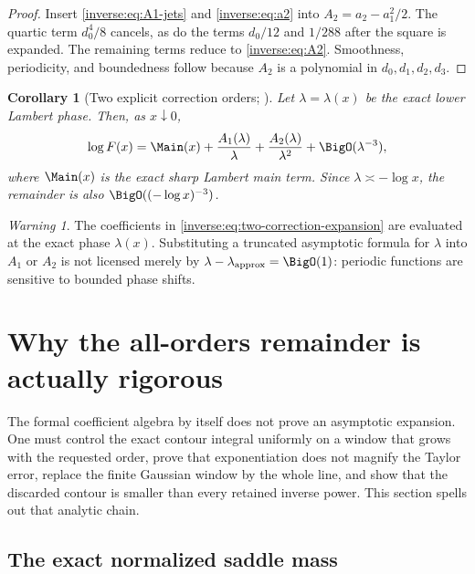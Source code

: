 \documentclass[11pt,oneside]{article}
\newtheorem{corollary}[corollary]{Corollary}
\theoremstyle{definition}
\theoremstyle{remark}
\newtheorem{warning}[warning]{Warning}
\begin{document}
\begin{proof}
Insert \eqref{inverse:eq:A1-jets} and \eqref{inverse:eq:a2} into
$A_2=a_2-a_1^2/2$.  The quartic term $d_0^4/8$ cancels, as do the
terms $d_0/12$ and $1/288$ after the square is expanded.  The remaining
terms reduce to \eqref{inverse:eq:A2}.  Smoothness, periodicity, and boundedness
follow because $A_2$ is a polynomial in $d_0,d_1,d_2,d_3$.
\end{proof}

\begin{corollary}[Two explicit correction orders; \Formalized]
\label{inverse:cor:two-corrections}
Let $\lambda=\lambda(x)$ be the exact lower Lambert phase.  Then, as
$x\downarrow0$,
\begin{equation}
 \log F(x)
 =\Main(x)+\frac{A_1(\lambda)}{\lambda}
          +\frac{A_2(\lambda)}{\lambda^2}
          +\BigO(\lambda^{-3}), \label{inverse:eq:two-correction-expansion}
\end{equation}
where $\Main(x)$ is the exact sharp Lambert main term.  Since
$\lambda\asymp-\log x$, the remainder is also
$\BigO((-\log x)^{-3})$.
\end{corollary}

\begin{warning}
The coefficients in \eqref{inverse:eq:two-correction-expansion} are evaluated at
the exact phase $\lambda(x)$.  Substituting a truncated asymptotic formula
for $\lambda$ into $A_1$ or $A_2$ is not licensed merely by
$\lambda-\lambda_{\rm approx}=\BigO(1)$: periodic functions are sensitive
to bounded phase shifts.
\end{warning}


\section{Why the all-orders remainder is actually rigorous}
\label{inverse:sec:all-orders-proof}

The formal coefficient algebra by itself does not prove an asymptotic
expansion.  One must control the exact contour integral uniformly on a
window that grows with the requested order, prove that exponentiation does
not magnify the Taylor error, replace the finite Gaussian window by the
whole line, and show that the discarded contour is smaller than every
retained inverse power.  This section spells out that analytic chain.

\subsection{The exact normalized saddle mass}
\end{document}
